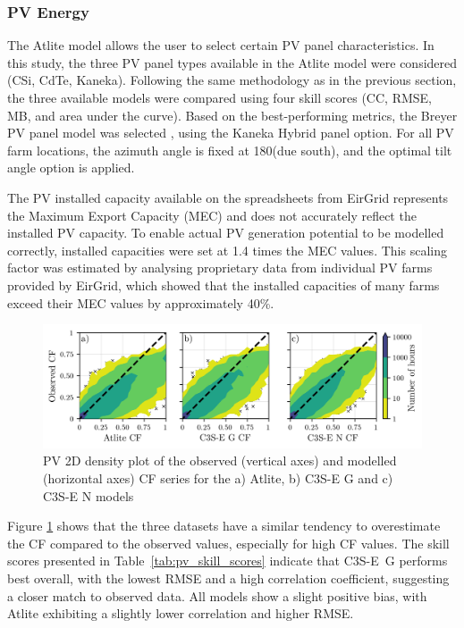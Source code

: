 \documentclass[a4paper, 11p1t]{article}
\begin{document}
\newpage
\subsubsection{PV Energy}
\label{sec:pv_verification}

The Atlite model allows the user to select certain PV panel characteristics. In this study, the three PV panel types available in the Atlite model were considered (CSi, CdTe, Kaneka). Following the same methodology as in the previous section, the three available models were compared using four skill scores (CC, RMSE, MB, and area under the curve). Based on the best-performing metrics, the Breyer PV panel model was selected \cite{beyer2004pv}, using the Kaneka Hybrid panel option. For all PV farm locations, the azimuth angle is fixed at 180\textdegree (due south), and the optimal tilt angle option is applied. 

The PV installed capacity available on the spreadsheets from EirGrid represents the Maximum Export Capacity (MEC) and does not accurately reflect the installed PV capacity. To enable actual PV generation potential to be modelled correctly, installed capacities were set at 1.4 times the MEC values. This scaling factor was estimated by analysing proprietary data from individual PV farms provided by EirGrid, which showed that the installed capacities of many farms exceed their MEC values by approximately 40\%.

\begin{figure}[h!]
	\centering
	\includegraphics{verification_pv_contour.png}
	\caption{PV 2D density plot of the observed (vertical axes) and modelled (horizontal axes) CF series for the a) Atlite, b) C3S-E G and c) C3S-E N models}	
	\label{fig:solar_verification_contour}
\end{figure}

Figure \ref{fig:solar_verification_contour} shows that the three datasets have a similar tendency to overestimate the CF compared to the observed values, especially for high CF values. The skill scores presented in Table~\ref{tab:pv_skill_scores} indicate that C3S-E~G performs best overall, with the lowest RMSE and a high correlation coefficient, suggesting a closer match to observed data. All models show a slight positive bias, with Atlite exhibiting a slightly lower correlation and higher RMSE.
\end{document}
